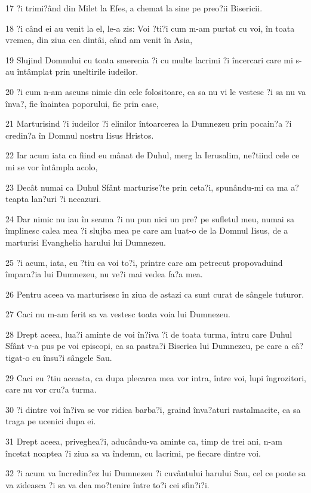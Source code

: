 \par 17 ?i trimi?ând din Milet la Efes, a chemat la sine pe preo?ii Bisericii.
\par 18 ?i când ei au venit la el, le-a zis: Voi ?ti?i cum m-am purtat cu voi, în toata vremea, din ziua cea dintâi, când am venit în Asia,
\par 19 Slujind Domnului cu toata smerenia ?i cu multe lacrimi ?i încercari care mi s-au întâmplat prin uneltirile iudeilor.
\par 20 ?i cum n-am ascuns nimic din cele folositoare, ca sa nu vi le vestesc ?i sa nu va înva?, fie înaintea poporului, fie prin case,
\par 21 Marturisind ?i iudeilor ?i elinilor întoarcerea la Dumnezeu prin pocain?a ?i credin?a în Domnul nostru Iisus Hristos.
\par 22 Iar acum iata ca fiind eu mânat de Duhul, merg la Ierusalim, ne?tiind cele ce mi se vor întâmpla acolo,
\par 23 Decât numai ca Duhul Sfânt marturise?te prin ceta?i, spunându-mi ca ma a?teapta lan?uri ?i necazuri.
\par 24 Dar nimic nu iau în seama ?i nu pun nici un pre? pe sufletul meu, numai sa împlinesc calea mea ?i slujba mea pe care am luat-o de la Domnul Iisus, de a marturisi Evanghelia harului lui Dumnezeu.
\par 25 ?i acum, iata, eu ?tiu ca voi to?i, printre care am petrecut propovaduind împara?ia lui Dumnezeu, nu ve?i mai vedea fa?a mea.
\par 26 Pentru aceea va marturisesc în ziua de astazi ca sunt curat de sângele tuturor.
\par 27 Caci nu m-am ferit sa va vestesc toata voia lui Dumnezeu.
\par 28 Drept aceea, lua?i aminte de voi în?iva ?i de toata turma, întru care Duhul Sfânt v-a pus pe voi episcopi, ca sa pastra?i Biserica lui Dumnezeu, pe care a câ?tigat-o cu însu?i sângele Sau.
\par 29 Caci eu ?tiu aceasta, ca dupa plecarea mea vor intra, între voi, lupi îngrozitori, care nu vor cru?a turma.
\par 30 ?i dintre voi în?iva se vor ridica barba?i, graind înva?aturi rastalmacite, ca sa traga pe ucenici dupa ei.
\par 31 Drept aceea, priveghea?i, aducându-va aminte ca, timp de trei ani, n-am încetat noaptea ?i ziua sa va îndemn, cu lacrimi, pe fiecare dintre voi.
\par 32 ?i acum va încredin?ez lui Dumnezeu ?i cuvântului harului Sau, cel ce poate sa va zideasca ?i sa va dea mo?tenire între to?i cei sfin?i?i.
